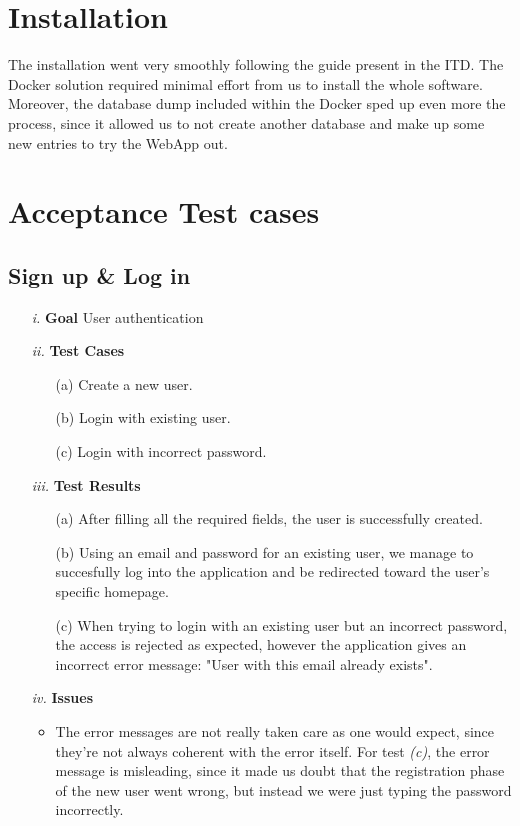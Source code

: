 \documentclass[table, 12pt]{article}
\begin{document}
\section{Installation}
The installation went very smoothly following the guide present in the ITD. The Docker solution required minimal effort from us to install the whole software. Moreover, the database dump included within the Docker sped up even more the process, since it allowed us to not create another database and make up some new entries to try the WebApp out.

\section{Acceptance Test cases}

\subsection{Sign up \& Log in}
\begin{itemize}
    \item[\textit{i.}] \textbf{Goal} User authentication
    \item[\textit{ii.}] \textbf{Test Cases}
    \begin{itemize}
        \item[(a)] Create a new user.
        \item[(b)] Login with existing user.
        \item[(c)] Login with incorrect password.
    \end{itemize} 
    \item[\textit{iii.}] \textbf{Test Results}
    \begin{itemize}
        \item[(a)] After filling all the required fields, the user is successfully created.
        \item[(b)] Using an email and password for an existing user, we manage to succesfully log into the application and be redirected toward the user's specific homepage.
        \item[(c)] When trying to login with an existing user but an incorrect password, the access is rejected as expected, however the application gives an incorrect error message: "User with this email already exists". 
    \end{itemize} 
    \item[\textit{iv.}] \textbf{Issues}    
    \begin{itemize}
        \item The error messages are not really taken care as one would expect, since they're not always coherent with the error itself. For test \emph{(c)}, the error message is misleading, since it made us doubt that the registration phase of the new user went wrong, but instead we were just typing the password incorrectly.
    \end{itemize} 
\end{itemize}
\end{document}
